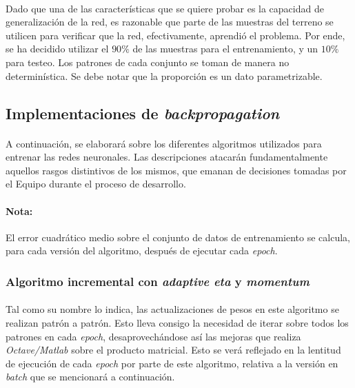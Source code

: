 \documentclass[12pt, twocolumn]{article}
\begin{document}
	\paragraph{} Dado que una de las características que se quiere probar es la capacidad de generalización de la red, es razonable que parte de las muestras del terreno se utilicen para verificar que la red, efectivamente, aprendió el problema. Por ende, se ha decidido utilizar el $90\%$ de las muestras para el entrenamiento, y un $10\%$ para testeo. Los patrones de cada conjunto se toman de manera no determinística. Se debe notar que la proporción es un dato parametrizable. 
	
	\subsection{Implementaciones de \textit{backpropagation}}
	
	\paragraph{} A continuación, se elaborará sobre los diferentes algoritmos utilizados para entrenar las redes neuronales. Las descripciones atacarán fundamentalmente aquellos rasgos distintivos de los mismos, que emanan de decisiones tomadas por el Equipo durante el proceso de desarrollo.
	
	\paragraph{Nota:} El error cuadrático medio sobre el conjunto de datos de entrenamiento se calcula, para cada versión del algoritmo, después de ejecutar cada \textit{epoch}.
	
	\subsubsection{Algoritmo incremental con \textit{adaptive eta} y \textit{momentum}}
	
	\paragraph{} Tal como su nombre lo indica, las actualizaciones de pesos en este algoritmo se realizan patrón a patrón. Esto lleva consigo la necesidad de iterar sobre todos los patrones en cada \textit{epoch}, desaprovechándose así las mejoras que realiza \textit{Octave/Matlab} sobre el producto matricial. Esto se verá reflejado en la lentitud de ejecución de cada \textit{epoch} por parte de este algoritmo, relativa a la versión en \textit{batch} que se mencionará a continuación.
	
\end{document}
